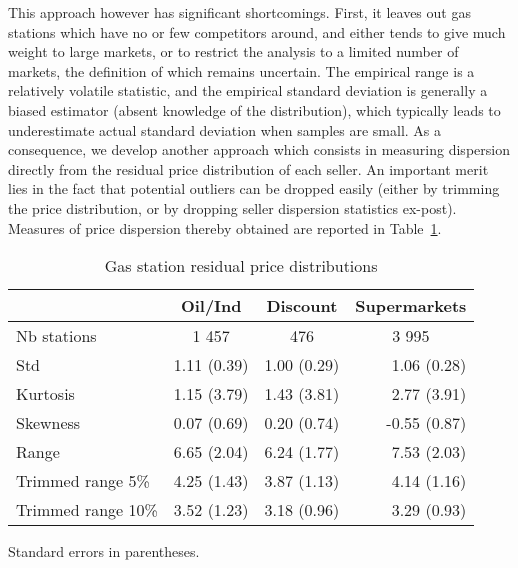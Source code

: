 \documentclass[english]{article}
\begin{document}
This approach however has significant shortcomings. First, it leaves out gas stations which have no or few competitors around, and either tends to give much weight to large markets, or to restrict the analysis to a limited number of markets, the definition of which remains uncertain. The empirical range is a relatively volatile statistic, and the empirical standard deviation is generally a biased estimator (absent knowledge of the distribution), which typically leads to underestimate actual standard deviation when samples are small. As a consequence, we develop another approach which consists in measuring dispersion directly from the residual price distribution of each seller. An important merit lies in the fact that potential outliers can be dropped easily (either by trimming the price distribution, or by dropping seller dispersion statistics ex-post). Measures of price dispersion thereby obtained are reported in Table~\ref{tab:station_price_support_stats_des}.

\begin{table}[H]
\caption{Gas station residual price distributions}
\label{tab:station_price_support_stats_des}
\begin{threeparttable}
\begin{tabular}{lrrr}
    \toprule
    \toprule
          & \multicolumn{1}{c}{Oil/Ind} & \multicolumn{1}{c}{Discount} & \multicolumn{1}{c}{Supermarkets} \\
    \midrule
    Nb stations & \multicolumn{1}{c}{1 457} & \multicolumn{1}{c}{476} & \multicolumn{1}{c}{3 995} \\
    Std   & 1.11 (0.39) & 1.00 (0.29) & 1.06 (0.28) \\
    Kurtosis & 1.15 (3.79) & 1.43 (3.81) & 2.77 (3.91) \\
    Skewness & 0.07 (0.69) & 0.20 (0.74) & -0.55 (0.87) \\
    Range & 6.65 (2.04) & 6.24 (1.77) & 7.53 (2.03) \\
    Trimmed range 5\% & 4.25 (1.43) & 3.87 (1.13) & 4.14 (1.16) \\
    Trimmed range 10\% & 3.52 (1.23) & 3.18 (0.96) & 3.29 (0.93) \\
    \bottomrule
    \bottomrule
\end{tabular}
\begin{tablenotes}
      \small
      \item Standard errors in parentheses.
\end{tablenotes}
\end{threeparttable}
\end{table}
\end{document}

